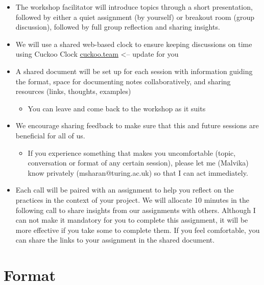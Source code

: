 \documentclass[
  letterpaper,
  DIV=11,
  numbers=noendperiod]{scrreport}
\providecommand{\tightlist}{%
  \setlength{\itemsep}{0pt}\setlength{\parskip}{0pt}}\usepackage{longtable,booktabs,array}
\begin{document}
\begin{itemize}
\tightlist
\item
  The workshop facilitator will introduce topics through a short
  presentation, followed by either a quiet assignment (by yourself) or
  breakout room (group discussion), followed by full group reflection
  and sharing insights.
\item
  We will use a shared web-based clock to ensure keeping discussions on
  time using Cuckoo Clock \href{https://cuckoo.team}{cuckoo.team}
  \textless-- update for you
\item
  A shared document will be set up for each session with information
  guiding the format, space for documenting notes collaboratively, and
  sharing resources (links, thoughts, examples)

  \begin{itemize}
  \tightlist
  \item
    You can leave and come back to the workshop as it suits
  \end{itemize}
\item
  We encourage sharing feedback to make sure that this and future
  sessions are beneficial for all of us.

  \begin{itemize}
  \tightlist
  \item
    If you experience something that makes you uncomfortable (topic,
    conversation or format of any certain session), please let me
    (Malvika) know privately (msharan@turing.ac.uk) so that I can act
    immediately.
  \end{itemize}
\item
  Each call will be paired with an assignment to help you reflect on the
  practices in the context of your project. We will allocate 10 minutes
  in the following call to share insights from our assignments with
  others. Although I can not make it mandatory for you to complete this
  assignment, it will be more effective if you take some to complete
  them. If you feel comfortable, you can share the links to your
  assignment in the shared document.
\end{itemize}

\hypertarget{format}{%
\section{Format}\label{format}}
\end{document}
